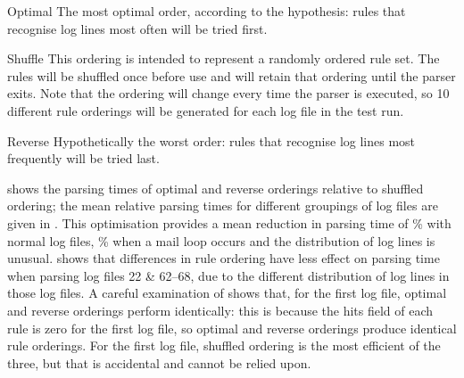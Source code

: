 \begin{eqlist}

    \item [Optimal]  The most optimal order, according to the hypothesis:
        rules that recognise log lines most often will be tried first.

    \item [Shuffle] This ordering is intended to represent a randomly
        ordered rule set.  The rules will be shuffled once before use and
        will retain that ordering until the parser exits.  Note that the
        ordering will change every time the parser is executed, so 10
        different rule orderings will be generated for each log file in the
        test run.

    \item [Reverse] Hypothetically the worst order: rules that recognise
        log lines most frequently will be tried last.

\end{eqlist}

 shows the
parsing times of optimal and reverse orderings relative to shuffled
ordering; the mean relative parsing times for different groupings of log
files are given in .  This optimisation provides a mean reduction in parsing time of
\%
with normal log files,
\%
when a mail loop occurs and the distribution of log lines is unusual.
 shows that
differences in rule ordering have less effect on parsing time when parsing
log files 22 \& 62--68, due to the different distribution of log lines in
those log files.  A careful examination of  shows that, for the first log file, optimal and
reverse orderings perform identically: this is because the hits field of
each rule is zero for the first log file, so optimal and reverse orderings
produce identical rule orderings.  For the first log file, shuffled
ordering is the most efficient of the three, but that is accidental and
cannot be relied upon.



